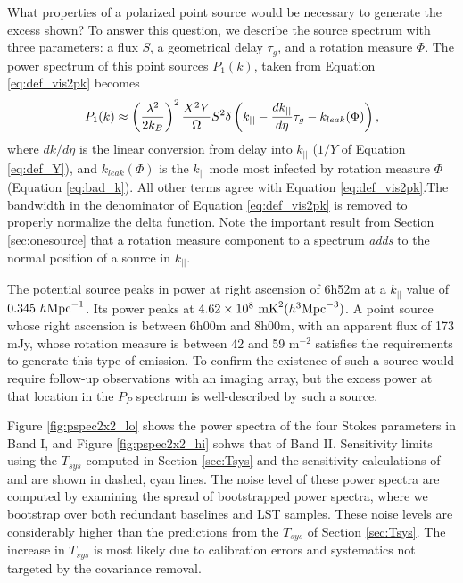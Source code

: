 What properties of a polarized point source would be necessary to generate the excess shown? To
answer this question, we describe the source spectrum with three parameters: a flux $S$, a
geometrical delay $\tau_g$, and a rotation measure $\Phi$. The power spectrum of this point sources
$P_1(k)$, taken from Equation \ref{eq:def_vis2pk} becomes 
\begin{equation}
  P_1(k) \approx \left(\frac{\lambda^2}{2k_B}\right)^2\frac{X^2Y}{\Omega}S^2
    \delta\left(k_{||} - \frac{d k_{||}}{d \eta}\tau_g - k_{leak}(\Phi)\right),
\end{equation}
where $dk/d\eta$ is the linear conversion from delay into $k_{||}$ ($1/Y$ of Equation \ref{eq:def_Y}),
and $k_{leak}(\Phi)$ is the $k_{||}$ mode most infected by rotation measure $\Phi$ (Equation
\ref{eq:bad_k}). All other terms agree with Equation \ref{eq:def_vis2pk}.The bandwidth in the
denominator of Equation \ref{eq:def_vis2pk} is removed to properly normalize the delta function.
Note the important result from Section \ref{sec:onesource} that a rotation measure component to a
spectrum \emph{adds} to the normal position of a source in $k_{||}$.

The potential source peaks in power at right ascension of 6h52m at a $k_{||}$ value of $0.345\ h{\rm
Mpc}^{-1}$. Its power peaks at $4.62\times10^8\ {\rm mK}^2(h^3{\rm Mpc}^{-3})$. A point source whose
right ascension is between 6h00m and 8h00m, with an apparent flux of 173 mJy, whose rotation measure
is between 42 and 59 m$^{-2}$ satisfies the requirements to generate this type of emission. To
confirm the existence of such a source would require follow-up observations with an imaging array,
but the excess power at that location in the $P_P$ spectrum is well-described by such a source.

Figure \ref{fig:pspec2x2_lo} shows the power spectra of the four Stokes parameters  in Band I, and
Figure \ref{fig:pspec2x2_hi} sohws that of Band II. Sensitivity limits using the $T_{sys}$ computed
in Section \ref{sec:Tsys} and the sensitivity calculations of \citet{PAPERSensitivity} and
\citet{Pober2014} are shown in dashed, cyan lines. The noise level of these power spectra are
computed by examining the spread of bootstrapped power spectra, where we bootstrap over both
redundant baselines and LST samples. These noise levels are considerably higher than the predictions
from the $T_{sys}$ of Section \ref{sec:Tsys}. The increase in $T_{sys}$ is most
likely due to calibration errors and systematics not targeted by the covariance removal.

